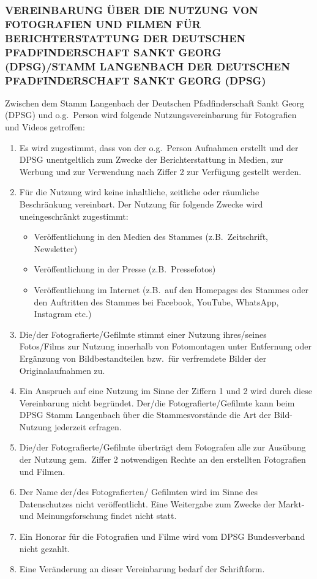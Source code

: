 
\subsubsection*{VEREINBARUNG ÜBER DIE NUTZUNG VON FOTOGRAFIEN UND FILMEN FÜR BERICHTERSTATTUNG DER 
	DEUTSCHEN PFADFINDERSCHAFT SANKT GEORG (DPSG)/STAMM LANGENBACH DER DEUTSCHEN 
	PFADFINDERSCHAFT SANKT GEORG (DPSG)}
Zwischen dem Stamm Langenbach der Deutschen Pfadfinderschaft Sankt Georg (DPSG) und o.g.\ Person wird folgende Nutzungsvereinbarung für Fotografien und
Videos getroffen:

\begin{enumerate}
	\item Es wird zugestimmt, dass von der o.g.\ Person Aufnahmen erstellt und der DPSG unentgeltlich zum
	Zwecke der Berichterstattung in Medien, zur Werbung und zur Verwendung nach Ziffer 2 zur 
	Verfügung gestellt werden.
	\item Für die Nutzung wird keine inhaltliche, zeitliche oder räumliche Beschränkung vereinbart.
	Der Nutzung für folgende Zwecke wird uneingeschränkt zugestimmt:
	\begin{itemize}[noitemsep]
		\item Veröffentlichung in den Medien des Stammes (z.B.\ Zeitschrift, Newsletter)
		\item Veröffentlichung in der Presse (z.B.\ Pressefotos)
		\item Veröffentlichung im Internet (z.B.\ auf den Homepages des Stammes oder den Auftritten des
		Stammes bei Facebook, YouTube, WhatsApp, Instagram etc.)
	\end{itemize}
	\item Die/der Fotografierte/Gefilmte stimmt einer Nutzung ihres/seines Fotos/Films zur Nutzung innerhalb 
	von Fotomontagen unter Entfernung oder Ergänzung von Bildbestandteilen bzw.\ für verfremdete
	Bilder der Originalaufnahmen zu.
	\item Ein Anspruch auf eine Nutzung im Sinne der Ziffern 1 und 2 wird durch diese Vereinbarung nicht 
	begründet.
	Der/die Fotografierte/Gefilmte kann beim DPSG Stamm Langenbach über die
	Stammesvorstände die Art der Bild-Nutzung jederzeit erfragen.
	\item Die/der Fotografierte/Gefilmte überträgt dem Fotografen alle zur Ausübung der Nutzung gem.\ Ziffer 2
	notwendigen Rechte an den erstellten Fotografien und Filmen.
	\item Der Name der/des Fotografierten/ Gefilmten wird im Sinne des Datenschutzes nicht veröffentlicht. 
	Eine Weitergabe zum Zwecke der Markt- und Meinungsforschung findet nicht statt.
	\item Ein Honorar für die Fotografien und Filme wird vom DPSG Bundesverband nicht gezahlt.
	\item Eine Veränderung an dieser Vereinbarung bedarf der Schriftform.
\end{enumerate}
